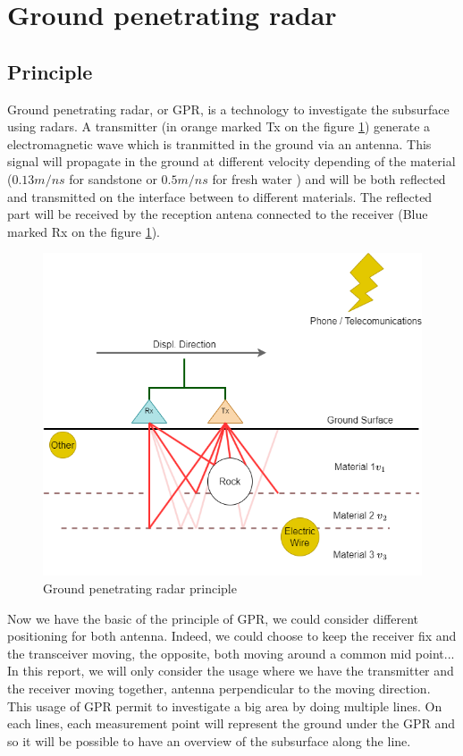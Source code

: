 \newpage
\section{Ground penetrating radar}

\subsection{Principle}

Ground penetrating radar, or GPR, is a technology to investigate the subsurface using radars. A transmitter (in orange marked Tx on the figure \ref{fig:GPR}) generate a electromagnetic wave which is tranmitted in the ground via an antenna. This signal will propagate in the ground at different velocity depending of the material ($0.13 m/ns$ for sandstone or $0.5 m/ns$ for fresh water \cite{GPRAnalysis}) and will be both reflected and transmitted on the interface between to different materials. The reflected part will be received by the reception antena connected to the receiver (Blue marked Rx on the figure \ref{fig:GPR}).

\begin{figure}[h]
    \centering
    \includegraphics[width=0.8\linewidth]{Images/00_Theory/GPR Diagramm.drawio.png}
    \caption{Ground penetrating radar principle}
    \label{fig:GPR}
\end{figure}

Now we have the basic of the principle of GPR, we could consider different positioning for both antenna. Indeed, we could choose to keep the receiver fix and the transceiver moving, the opposite, both moving around a common mid point... In this report, we will only consider the usage where we have the transmitter and the receiver moving together, antenna perpendicular to the moving direction.
This usage of GPR permit to investigate a big area by doing multiple lines. On each lines, each measurement point will represent the ground under the GPR and so it will be possible to have an overview of the subsurface along the line. \cite{RnningGroundPerformance}

